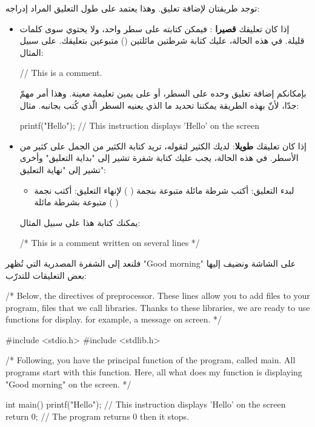 توجد طريقتان لإضافة تعليق. وهذا يعتمد على طول التعليق المراد إدراجه:
\begin{itemize}
  \item إذا كان تعليقك
\textbf{قصيرا}
: فيمكن كتابته على سطر واحد، ولا يحتوي سوى كلمات قليلة. في هذه الحالة، عليك كتابة شرطتين مائلتين
(\InlineCode{//})
متبوعين بتعليقك. على سبيل المثال:
\begin{Csource}
// This is a comment.
\end{Csource}
بإمكانكم إضافة تعليق وحده على السطر، أو على يمين تعليمة معينة. وهذا أمر مهمّ جدّا، لأنّ بهذه الطريقة يمكننا تحديد ما الذي يعنيه السطر الّذي كُتب بجانبه. مثال:
\begin{Csource}
printf("Hello"); // This instruction displays 'Hello' on the screen
\end{Csource}
  \item  إذا كان تعليقك
\textbf{طويلا}:
لديك الكثير لتقوله، تريد كتابة الكثير من الجمل على كثير من الأسطر. في هذه الحالة، يجب عليك كتابة شفرة تشير إلى "بداية التعليق" وأخرى تشير إلى "نهاية التعليق":
  \begin{itemize}
    \item لبدء التعليق: أكتب شرطة مائلة متبوعة بنجمة (
    \InlineCode{/*}
    )
    لإنهاء التعليق: أكتب نجمة متبوعة بشرطة مائلة (
    \InlineCode{*/}
    )
  \end{itemize}
  يمكنك كتابة هذا على سبيل المثال:
  \begin{Csource}
/* This is
a comment
written on several lines */
  \end{Csource}
\end{itemize}
فلنعد إلى الشفرة المصدرية التي تُظهر
"\textenglish{Good morning}"
على الشاشة ونضيف إليها بعض التعليقات للتدرّب:
\begin{Csource}
/*
Below, the directives of preprocessor.
These lines allow you to add files to your program,
files that we call libraries. Thanks to these libraries, we are ready to use functions for display.
for example, a message on screen.
*/

#include <stdio.h>
#include <stdlib.h>

/*
Following, you have the principal function of the program, called main.
All programs start with this function.
Here, all what does my function is displaying "Good morning" on the screen.
*/

int main()
{
  printf("Hello"); // This instruction displays 'Hello' on the screen
  return 0;          // The program returns 0 then it stops.
}
\end{Csource}

